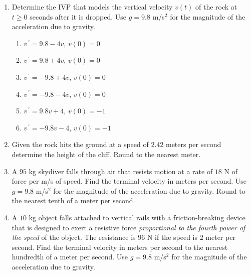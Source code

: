 \documentclass{ximera}
\begin{document}
\begin{enumerate}[label=(\arabic*)]

\item  Determine the IVP that models the vertical velocity $v(t)$ of the rock at $t\geq 0$ seconds after it is dropped.  Use $g=9.8$ m/s$^2$ for the magnitude of the acceleration due to gravity.

\begin{enumerate}[label=(\alph*)]
    \item $v^{\,\prime}=9.8-4v$, $v(0)=0$
    \item $v^{\,\prime}=9.8+4v$, $v(0)=0$
    \item $v^{\,\prime}=-9.8+4v$, $v(0)=0$
    \item $v^{\,\prime}=-9.8-4v$, $v(0)=0$ %
    \item $v^{\,\prime}=9.8v+4$, $v(0)=-1$
    \item $v^{\,\prime}=-9.8v-4$, $v(0)=-1$

\end{enumerate}


\item Given the rock hits the ground at a speed of $2.42$ meters per second determine the height of the cliff.  Round to the nearest meter.




\item A $95$ kg skydiver falls through air that resists motion at a rate of $18$ N of force per m/s of speed.  Find the terminal velocity in meters per second.  Use $g=9.8$ m/s$^2$ for the magnitude of the acceleration due to gravity.  Round to the nearest tenth of a meter per second.


\newpage


\item  A $10$ kg object falls attached to vertical rails with a friction-breaking device that is designed to exert a resistive force \emph{proportional to the fourth power of the speed} of the object.  The resistance is $96$ N if the speed is $2$ meter per second.  Find the terminal velocity in meters per second to the nearest hundredth of a meter per second.  Use $g=9.8$ m/s$^2$ for the magnitude of the acceleration due to gravity.


\end{enumerate}
\end{document}
